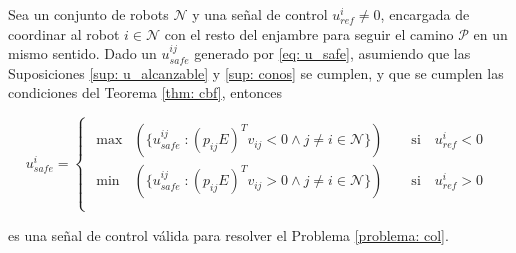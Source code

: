 \begin{prop} \label{prop: multi_cbf}
    Sea un conjunto de robots $\mathcal{N}$ y una señal de control $u_{ref}^i \neq 0$, encargada de coordinar al robot $i\in\mathcal{N}$ con el resto del enjambre para seguir el camino $\mathcal{P}$ en un mismo sentido. Dado un $u_{safe}^{ij}$ generado por \eqref{eq: u_safe}, asumiendo que las Suposiciones \ref{sup: u_alcanzable} y \ref{sup: conos} se cumplen, y que se cumplen las condiciones del Teorema \ref{thm: cbf}, entonces

    \begin{equation}
        u_{safe}^{i} = 
        \begin{cases}
            \begin{array}{lr}
                \max & (\{u_{safe}^{ij} \; :  (p_{ij} E)^T v_{ij} < 0 \wedge j \neq i \in \mathcal{N}\}) \qquad 
                \text{si} \quad u_{ref}^i<0\\
                \min & (\{u_{safe}^{ij} \; : (p_{ij} E)^T v_{ij} > 0 \wedge j \neq i \in \mathcal{N}\}) \qquad
                \text{si} \quad u_{ref}^i>0\\
            \end{array}
        \end{cases}
    \end{equation}

    es una señal de control válida para resolver el Problema \eqref{problema: col}.
\end{prop}

    
